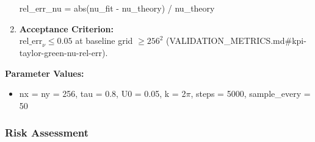 \documentclass[
]{article}
\newenvironment{Shaded}{}{}
\newcommand{\BuiltInTok}[1]{\textcolor[rgb]{0.00,0.50,0.00}{#1}}
\newcommand{\NormalTok}[1]{#1}
\newcommand{\OperatorTok}[1]{\textcolor[rgb]{0.40,0.40,0.40}{#1}}
\providecommand{\tightlist}{%
  \setlength{\itemsep}{0pt}\setlength{\parskip}{0pt}}
\begin{document}
\begin{enumerate}
\begin{Shaded}
\begin{Highlighting}[]
\NormalTok{rel\_err\_nu }\OperatorTok{=} \BuiltInTok{abs}\NormalTok{(nu\_fit }\OperatorTok{{-}}\NormalTok{ nu\_theory) }\OperatorTok{/}\NormalTok{ nu\_theory}
\end{Highlighting}
\end{Shaded}
\item
  \textbf{Acceptance Criterion:}\\
  \(\mathrm{rel\_err}_{\nu} \le 0.05\) at baseline grid \(\ge 256^{2}\)
  (VALIDATION\_METRICS.md\#kpi-taylor-green-nu-rel-err).
\end{enumerate}

\textbf{Parameter Values:}

\begin{itemize}
\tightlist
\item
  nx = ny = 256, tau = 0.8, U0 = 0.05, k = 2$\pi$, steps = 5000,
  sample\_every = 50
\end{itemize}

\hypertarget{risk-assessment}{%
\subsubsection{Risk Assessment}\label{risk-assessment}}
\end{document}
